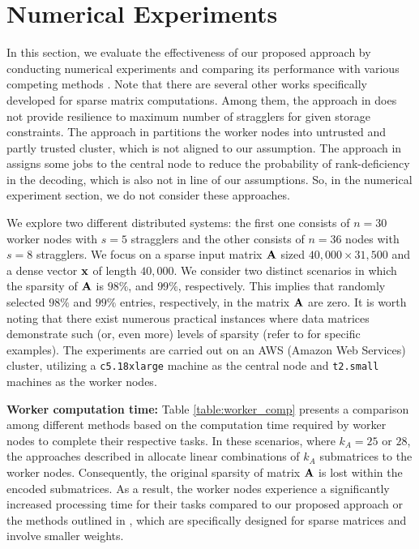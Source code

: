 \section{Numerical Experiments}
\label{sec:numexp}

In this section, we evaluate the effectiveness of our proposed approach by conducting numerical experiments and comparing its performance with various competing methods \cite{yu2017polynomial, 8849468, 8919859, das2020coded, dasunifiedtreatment, das2023jsait_submitted}. Note that there are several other works specifically developed for sparse matrix computations. Among them, the approach in \cite{wang2018coded} does not provide resilience to maximum number of stragglers for given storage constraints. The approach in \cite{xhemrishi2022distributed} partitions the worker nodes into untrusted and partly trusted cluster, which is not aligned to our assumption. The approach in \cite{ji2022sparse} assigns some jobs to the central node to reduce the probability of rank-deficiency in the decoding, which is also not in line of our assumptions. So, in the numerical experiment section, we do not consider these approaches.

We explore two different distributed systems: the first one consists of $n = 30$ worker nodes with $s = 5$ stragglers and the other consists of $n = 36$ nodes with $s = 8$ stragglers. We focus on a sparse input matrix $\mathbf{A}$ sized $40,000 \times 31,500$ and a dense vector $\mathbf{x}$ of length $40,000$. We consider two distinct scenarios in which the sparsity of $\mathbf{A}$ is $98\%$, and $99\%$, respectively. This implies that randomly selected $98\%$ and $99\%$ entries, respectively, in the matrix $\mathbf{A}$ are zero. It is worth noting that there exist numerous practical instances where data matrices demonstrate such (or, even more) levels of sparsity (refer to \cite{sparsematrices} for specific examples). The experiments are carried out on an AWS (Amazon Web Services) cluster, utilizing a {\tt c5.18xlarge} machine as the central node and {\tt t2.small} machines as the worker nodes.

\vspace{0.05 in}

{\bf Worker computation time:} Table \ref{table:worker_comp} presents a comparison among different methods based on the computation time required by worker nodes to complete their respective tasks. In these scenarios, where $k_A = 25$ or $28$, the approaches described in \cite{yu2017polynomial, 8849468, 8919859} allocate linear combinations of $k_A$ submatrices to the worker nodes. Consequently, the original sparsity of matrix $\mathbf{A}$ is lost within the encoded submatrices. As a result, the worker nodes experience a significantly increased processing time for their tasks compared to our proposed approach or the methods outlined in \cite{das2020coded, dasunifiedtreatment, das2023jsait_submitted}, which are specifically designed for sparse matrices and involve smaller weights.

